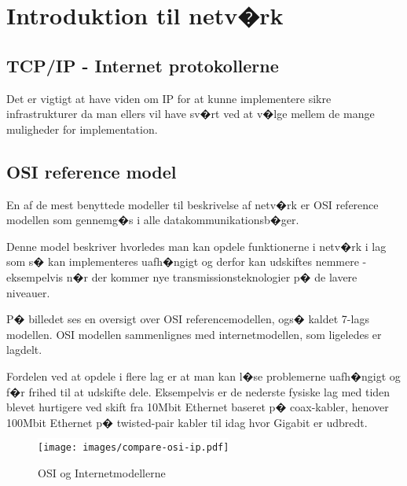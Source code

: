 \documentclass[a4paper,11pt,notitlepage]{oevelser}
\begin{document}



\chapter*{\color{titlecolor}Introduktion til netv�rk}
\label{chap:intro}

\section*{\color{titlecolor}TCP/IP - Internet protokollerne}
Det er vigtigt at have viden om IP for at kunne implementere sikre
infrastrukturer da man ellers vil have sv�rt ved at v�lge mellem de
mange muligheder for implementation.

\section*{\color{titlecolor}OSI reference model}
En af de mest benyttede modeller til beskrivelse af netv�rk er OSI
reference modellen som gennemg�s i alle datakommunikationsb�ger.

Denne model beskriver hvorledes man kan opdele funktionerne i netv�rk
i lag som s� kan implementeres uafh�ngigt og derfor kan udskiftes
nemmere - eksempelvis n�r der kommer nye transmissionsteknologier p�
de lavere niveauer.

P� billedet ses en oversigt over OSI referencemodellen, ogs� kaldet
7-lags modellen. OSI modellen sammenlignes med internetmodellen, som
ligeledes er lagdelt.

Fordelen ved at opdele i flere lag er at man kan l�se problemerne
uafh�ngigt og f�r frihed til at udskifte dele. Eksempelvis er de
nederste fysiske lag med tiden blevet hurtigere ved skift fra 10Mbit
Ethernet baseret p� coax-kabler, henover 100Mbit Ethernet p�
twisted-pair kabler til idag hvor Gigabit er udbredt.


\begin{figure}[H]
\label{fig:osi}
\begin{center}
\colorbox{white}{\texttt{[image: images/compare-osi-ip.pdf]}}
\end{center}
\caption{OSI og Internetmodellerne}
\end{figure}
\end{document}
